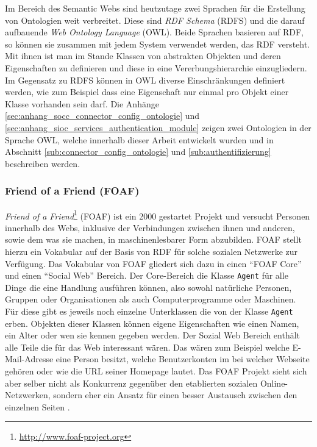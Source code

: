 Im Bereich des Semantic Webs sind heutzutage zwei Sprachen für die Erstellung von Ontologien weit verbreitet. Diese sind \emph{RDF Schema} (RDFS)\cite{Brickley} und die darauf aufbauende \emph{Web Ontology Language} (OWL)\cite{partelschneider2004}. Beide Sprachen basieren auf RDF, so können sie zusammen mit jedem System verwendet werden, das RDF versteht. Mit ihnen ist man im Stande Klassen von abstrakten Objekten und deren Eigenschaften zu definieren und diese in eine Vererbungshierarchie einzugliedern. Im Gegensatz zu RDFS können in OWL diverse Einschränkungen definiert werden, wie zum Beispiel dass eine Eigenschaft nur einmal pro Objekt einer Klasse vorhanden sein darf. Die Anhänge \ref{sec:anhang_socc_connector_config_ontologie} und \ref{sec:anhang_sioc_services_authentication_module} zeigen zwei Ontologien in der Sprache OWL, welche innerhalb dieser Arbeit entwickelt wurden und in Abschnitt \ref{sub:connector_config_ontologie} und \ref{sub:authentifizierung} beschreiben werden.



\subsubsection{Friend of a Friend (FOAF)} %
\label{ssub:friend_of_a_friend_}

\emph{Friend of a Friend}\footnote{\url{http://www.foaf-project.org}} (FOAF) ist ein 2000 gestartet Projekt und versucht Personen innerhalb des Webs, inklusive der Verbindungen zwischen ihnen und anderen, sowie dem was sie machen, in maschinenlesbarer Form abzubilden. FOAF stellt hierzu ein Vokabular \cite{Brickley2010} auf der Basis von RDF für solche sozialen Netzwerke zur Verfügung. Das Vokabular von FOAF gliedert sich dazu in einen \enquote{FOAF Core} und einen \enquote{Social Web} Bereich. Der Core-Bereich die Klasse \texttt{Agent} für alle Dinge die eine Handlung ausführen können, also sowohl natürliche Personen, Gruppen oder Organisationen als auch Computerprogramme oder Maschinen. Für diese gibt es jeweils noch einzelne Unterklassen die von der Klasse \texttt{Agent} erben. Objekten dieser Klassen können eigene Eigenschaften wie einen Namen, ein Alter oder wen sie kennen gegeben werden. Der Sozial Web Bereich enthält alle Teile die für das Web interessant wären. Das wären zum Beispiel welche E-Mail-Adresse eine Person besitzt, welche Benutzerkonten im bei welcher Webseite gehören oder wie die URL seiner Homepage lautet. Das FOAF Projekt sieht sich aber selber nicht als Konkurrenz gegenüber den etablierten sozialen Online-Netzwerken, sondern eher ein Ansatz für einen besser Austausch zwischen den einzelnen Seiten \cite[Abstract]{Brickley2010}.

